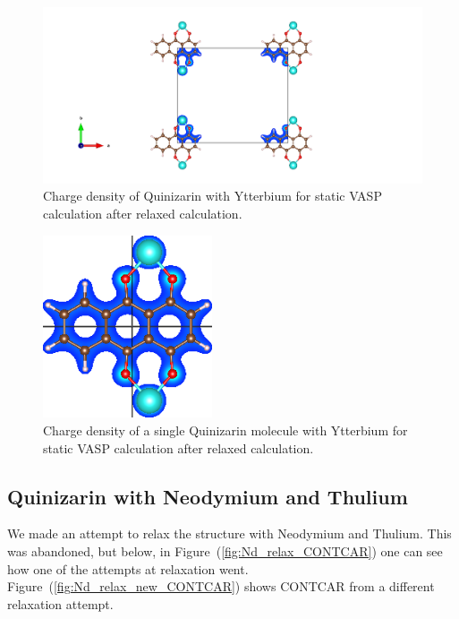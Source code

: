 \documentclass{article}
\begin{document}
      \begin{figure}[H]
          \centering
          \includegraphics[width = \textwidth]{../fig/Yb_staticafter_CHGCAR.png}
          \caption{Charge density of Quinizarin with Ytterbium for static VASP calculation after relaxed calculation. }
          \label{fig:Yb_staticafter_CHGCAR}
      \end{figure}

      \begin{figure}[H]
        \centering
        \includegraphics[width = 5cm]{../fig/Yb_staticafter_CHGDENSITY.png}
        \caption{Charge density of a single Quinizarin molecule with Ytterbium for static VASP calculation after relaxed calculation. }
        \label{fig:Yb_staticafter_CHGDENSITY}
      \end{figure}

      \vspace{1cm}

  \subsection{Quinizarin with Neodymium and Thulium}

    We made an attempt to relax the structure with Neodymium and Thulium. This was abandoned, but below, in Figure~(\ref{fig:Nd_relax_CONTCAR}) one can see how one of the attempts at relaxation went. Figure~(\ref{fig:Nd_relax_new_CONTCAR}) shows CONTCAR from a different relaxation attempt.
\end{document}
